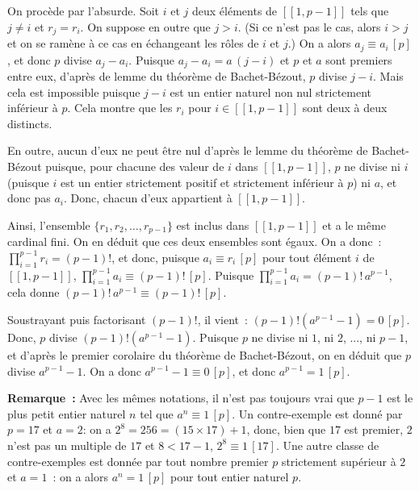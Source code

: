 On procède par l'absurde. 
Soit $i$ et $j$ deux éléments de $[\![1, p-1]\!]$ tels que $j \neq i$ et $r_j = r_i$. 
On suppose en outre que $j > i$. 
(Si ce n'est pas le cas, alors $i > j$ et on se ramène à ce cas en échangeant les rôles de $i$ et $j$.)
On a alors $a_j \equiv a_i \, [p]$, et donc $p$ divise $a_j - a_i$. 
Puisque $a_j - a_i = a \, (j-i)$ et $p$ et $a$ sont premiers entre eux, d'après de lemme du théorème de Bachet-Bézout, $p$ divise $j-i$. 
Mais cela est impossible puisque $j-i$ est un entier naturel non nul strictement inférieur à $p$. 
Cela montre que les $r_i$ pour $i \in [\![1, p-1]\!]$ sont deux à deux distincts. 

En outre, aucun d'eux ne peut être nul d'après le lemme du théorème de Bachet-Bézout puisque, pour chacune des valeur de $i$ dans $[\![1,p-1]\!]$, $p$ ne divise ni $i$ (puisque $i$ est un entier strictement positif et strictement inférieur à $p$) ni $a$, et donc pas $a_i$.
Donc, chacun d'eux appartient à $[\![1, p-1]\!]$.

Ainsi, l'ensemble $\lbrace r_1, r_2, \dots, r_{p-1} \rbrace$ est inclus dans $[\![1, p-1]\!]$ et a le même cardinal fini. 
On en déduit que ces deux ensembles sont égaux. 
On a donc : $\prod_{i=1}^{p-1} r_i = (p-1)!$, et donc, puisque $a_i \equiv r_i \, [p]$ pour tout élément $i$ de $[\![1, p-1]\!]$, $\prod_{i=1}^{p-1} a_i \equiv (p-1)! \, [p]$.
Puisque $\prod_{i=1}^{p-1} a_i = (p-1)! \, a^{p-1}$, cela donne $(p-1)! \, a^{p-1} \equiv (p-1)! \, [p]$.

Soustrayant puis factorisant $(p-1)!$, il vient : $(p-1)! \left( a^{p-1} - 1 \right) = 0 \, [p]$. 
Donc, $p$ divise $(p-1)! \left( a^{p-1} - 1 \right)$. 
Puisque $p$ ne divise ni $1$, ni $2$, ..., ni $p-1$, et d'après le premier corolaire du théorème de Bachet-Bézout, on en déduit que $p$ divise $a^{p-1} - 1$. 
On a donc $a^{p-1} - 1 \equiv 0 \, [p]$, et donc $a^{p-1} = 1 \, [p]$.

\done

\medskip

\noindent\textbf{Remarque :} Avec les mêmes notations, il n'est pas toujours vrai que $p-1$ est le plus petit entier naturel $n$ tel que $a^n \equiv 1 \, [p]$.
    Un contre-exemple est donné par $p = 17$ et $a = 2$: on a $2^8 = 256 = (15 \times 17) + 1$, donc, bien que $17$ est premier, $2$ n'est pas un multiple de $17$ et $8 < 17 - 1$, $2^8 \equiv 1 \, [17]$. 
    Une autre classe de contre-exemples est donnée par tout nombre premier $p$ strictement supérieur à $2$ et $a = 1$ : on a alors $a^n = 1 \, [p]$ pour tout entier naturel $p$.


